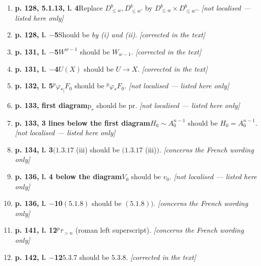\documentclass[12pt,oneside]{amsbook}
\theoremstyle{plain}
\theoremstyle{definition}
\begin{document}
\begin{enumerate}[label={\arabic*.},leftmargin=2.6em,itemsep=4pt]
\item \textbf{p. 128, 5.1.13, l. 4}\quad Replace $D^{b}_{\leq w},D^{b}_{\leq w'}$ by $D^{b}_{\leq w}\times D^{b}_{\leq w'}$. \hfill\newline \textsl{[not localised --- listed here only]}
\item \textbf{p. 128, l. $-$5}\quad Should be \emph{by (i) and (ii)}. \hfill\newline \textsl{[corrected in the text]}
\item \textbf{p. 131, l. $-$5}\quad $W^{w-1}$ should be $W_{w-1}$. \hfill\newline \textsl{[corrected in the text]}
\item \textbf{p. 131, l. $-$4}\quad $U(X)$ should be $U\to X$. \hfill\newline \textsl{[corrected in the text]}
\item \textbf{p. 132, l. 5}\quad ${}^{p}\varphi_{*|}F_{0}$ should be ${}^{p}\varphi_{*}F_{0}$. \hfill\newline \textsl{[not localised --- listed here only]}
\item \textbf{p. 133, first diagram}\quad $\mathrm{p}_{r}$ should be $\mathrm{pr}$. \hfill\newline \textsl{[not localised --- listed here only]}
\item \textbf{p. 133, 3 lines below the first diagram}\quad $H_{0}\sim A_{0}^{n-1}$ should be $H_{0}=A_{0}^{n-1}$. \hfill\newline \textsl{[not localised --- listed here only]}
\item \textbf{p. 134, l. 3}\quad $(1.3.17$ (iii) should be $(1.3.17$ (iii)$)$. \hfill\newline \textsl{[concerns the French wording only]}
\item \textbf{p. 136, l. 4 below the diagram}\quad $V_{0}$ should be $v_{0}$. \hfill\newline \textsl{[not localised --- listed here only]}
\item \textbf{p. 136, l. $-$10}\quad $(5.1.8)$ should be $(5.1.8))$. \hfill\newline \textsl{[concerns the French wording only]}
\item \textbf{p. 141, l. 12}\quad ${}^{p}\tau_{>n}$ (roman left superscript). \hfill\newline \textsl{[concerns the French wording only]}
\item \textbf{p. 142, l. $-$12}\quad $5.3.7$ should be $5.3.8$. \hfill\newline \textsl{[corrected in the text]}

\end{enumerate}
\end{document}
